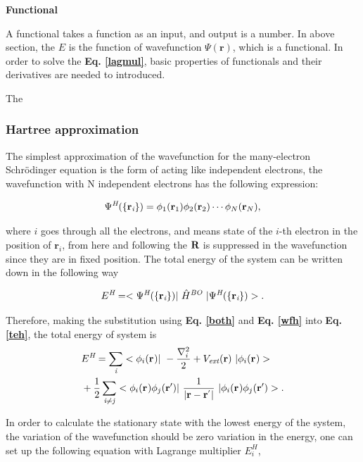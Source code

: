 \documentclass[a4paper, 12pt, titlepage,oneside,drop]{kthesis}
\begin{document}
\textbf{Functional}

A functional takes a function as an input, and output is a number. In above section, the $E$ is the function of wavefunction $\Psi(\textbf{r})$, which is a functional. In order to solve the \textbf{Eq. \ref{lagmul}}, basic properties
of functionals and their derivatives are needed to introduced.

The 

\subsubsection{Hartree approximation}
\label{ha}
The simplest approximation of the wavefunction for the many-electron Schrödinger equation is the form of acting like independent
electrons, the wavefunction with N independent electrons has the following expression:

\begin{equation}\label{wfh}
\wfh = \bwff<1><1> \bwff<2><2> \cdots \bwff<N><N>, 
\end{equation}

where $i$ goes through all the electrons, and  means state of the $i$-th electron in the position of ${\textbf{r}}_{\textit{i}}$, 
from here and following the $\textbf R$ is suppressed in the wavefunction since they are in fixed position. The total energy of the system can be written down 
in the following way

\begin{equation}\label{teh}
E^{\textit{H}} = <\Psi^{{\textit H}}(\{ {\textbf r}_{{\textit i}}\}) |\ {\hat{H}}^{\textit{BO}} \ | \Psi^{{\textit H}}(\{ {\textbf r}_{{\textit i}}\})  >.
\end{equation}

Therefore, making the substitution using \textbf{Eq. \ref{both}} and \textbf{Eq. \ref{wfh}} into \textbf{Eq. \ref{teh}}, the total energy of system is
\begin{equation}\begin{split}
&E^\textit{H} = \sumi<i> <\bwff<i><> |\ -\frac{\nabla^{2}_{i}}{2} + V_\textit{ext}(\textbf{r})  \ | \bwff<i><> > \\
& +\frac{1}{2} \suminj<i><j> <\bwff<i><> \bwfn<j><'>|\ \frac{1}{|\textbf{r} - \textbf{r}^{'} |} \ | \bwff<i><> \bwfn<j><'>>.
\end{split}\end{equation}

In order to calculate the stationary state with the lowest energy of the system, the variation of the wavefunction should be
zero variation in the energy, one can set up the following equation with Lagrange multiplier $E_{i}^H$,
\end{document}
